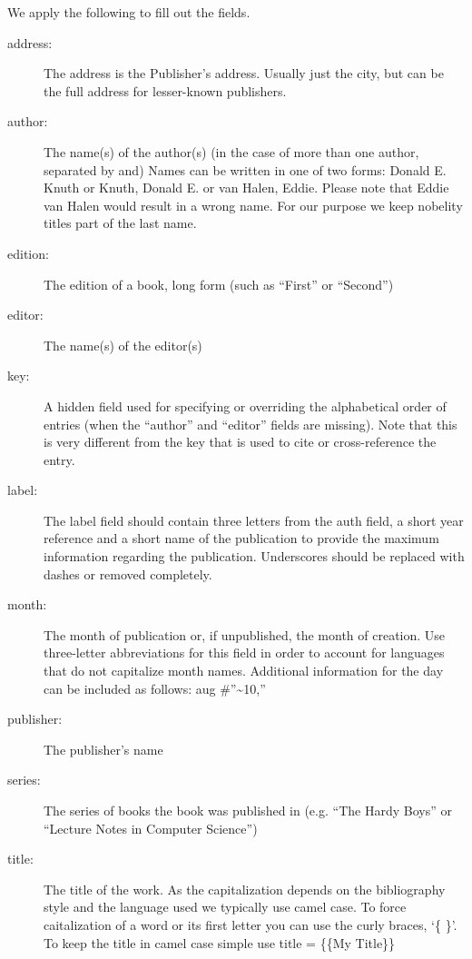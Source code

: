 We apply the following to fill out the fields.
\begin{description}
\item[{address:}] \leavevmode
The address is the Publisher's address. Usually just the city, but can
be the full address for lesser-known publishers.

\item[{author:}] \leavevmode
The name(s) of the author(s) (in the case of more than one author, separated by and)
Names can be written in one of two forms: Donald E. Knuth or Knuth,
Donald E. or van Halen, Eddie. Please note that Eddie van Halen
would result in a wrong name. For our purpose we keep nobelity
titles part of the last name.

\item[{edition:}] \leavevmode
The edition of a book, long form (such as ``First'' or ``Second'')

\item[{editor:}] \leavevmode
The name(s) of the editor(s)

\item[{key:}] \leavevmode
A hidden field used for specifying or overriding the alphabetical
order of entries (when the ``author'' and ``editor'' fields are missing).
Note that this is very different from the key that is used to cite or
cross-reference the entry.

\item[{label:}] \leavevmode
The label field should contain three letters from the auth field, a
short year reference and a short name of the publication to provide
the maximum information regarding the
publication.  Underscores should be replaced with dashes or removed completely.

\item[{month:}] \leavevmode
The month of publication or, if unpublished, the month of creation.
Use three-letter abbreviations for this field in order to account
for languages that do not capitalize month names.
Additional information for the day can be included as follows: aug \#''\textasciitilde{}10,''

\item[{publisher:}] \leavevmode
The publisher's name

\item[{series:}] \leavevmode
The series of books the book was published in (e.g. ``The Hardy Boys''
or ``Lecture Notes in Computer Science'')

\item[{title:}] \leavevmode
The title of the work. As the capitalization depends on the
bibliography style and the language used we typically use camel case.
To force caitalization of a word or its first letter you can use the
curly braces, `\{ \}'.
To keep the title in camel case simple use title = \{\{My Title\}\}


\end{description}

